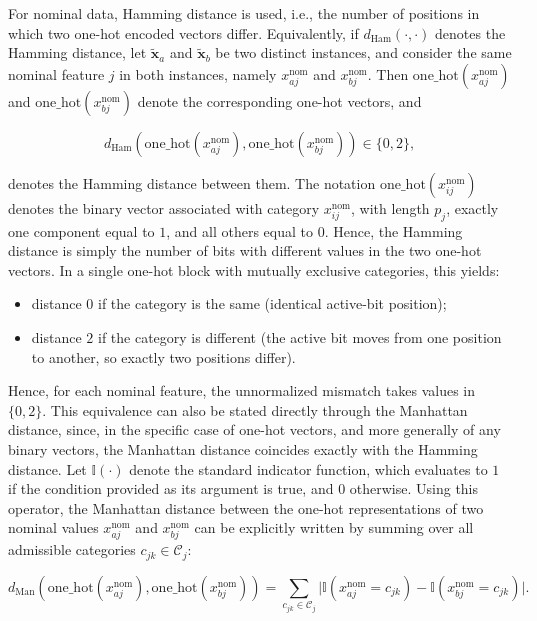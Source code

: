 For nominal data, Hamming distance is used, i.e., the number of positions in which two one-hot encoded vectors differ. Equivalently, if $d_{\mathrm{Ham}}(\cdot,\cdot)$ denotes the Hamming distance, let $\tilde{\mathbf{x}}_a$ and $\tilde{\mathbf{x}}_b$ be two distinct instances, and consider the same nominal feature $j$ in both instances, namely $x^{\mathrm{nom}}_{aj}$ and $x^{\mathrm{nom}}_{bj}$. Then $\mathrm{one\_hot}(x^{\mathrm{nom}}_{aj})$ and $\mathrm{one\_hot}(x^{\mathrm{nom}}_{bj})$ denote the corresponding one-hot vectors, and

\begin{equation}
  d_{\mathrm{Ham}}\!\left(\mathrm{one\_hot}(x^{\mathrm{nom}}_{aj}),\mathrm{one\_hot}(x^{\mathrm{nom}}_{bj})\right) \in \{0,2\},
\end{equation}

denotes the Hamming distance between them. The notation $\mathrm{one\_hot}(x^{\mathrm{nom}}_{ij})$ denotes the binary vector associated with category $x^{\mathrm{nom}}_{ij}$, with length $p_j$, exactly one component equal to $1$, and all others equal to $0$. Hence, the Hamming distance is simply the number of bits with different values in the two one-hot vectors. In a single one-hot block with mutually exclusive categories, this yields:

\begin{itemize}
  \item distance $0$ if the category is the same (identical active-bit position);
  \item distance $2$ if the category is different (the active bit moves from one position to another, so exactly two positions differ).
\end{itemize}

Hence, for each nominal feature, the unnormalized mismatch takes values in $\{0,2\}$. This equivalence can also be stated directly through the Manhattan distance, since, in the specific case of one-hot vectors, and more generally of any binary vectors, the Manhattan distance coincides exactly with the Hamming distance. Let $\mathbb{I}(\cdot)$ denote the standard indicator function, which evaluates to $1$ if the condition provided as its argument is true, and $0$ otherwise. Using this operator, the Manhattan distance between the one-hot representations of two nominal values $x^{\mathrm{nom}}_{aj}$ and $x^{\mathrm{nom}}_{bj}$ can be explicitly written by summing over all admissible categories $c_{jk} \in \mathcal{C}_j$:

\begin{equation}
  d_{\mathrm{Man}}\!\left(\mathrm{one\_hot}(x^{\mathrm{nom}}_{aj}), \mathrm{one\_hot}(x^{\mathrm{nom}}_{bj})\right) = \sum_{c_{jk} \in \mathcal{C}_j} \bigl | \mathbb{I}(x^{\mathrm{nom}}_{aj} = c_{jk}) - \mathbb{I}(x^{\mathrm{nom}}_{bj} = c_{jk}) \bigr |.
\end{equation}

